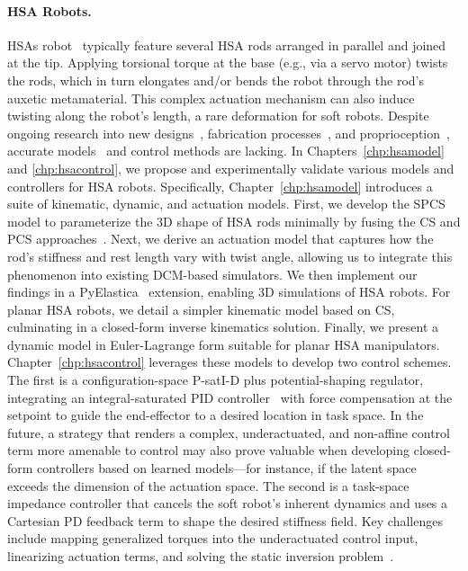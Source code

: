 \paragraph{HSA Robots.}
\glspl{HSA} robot~\citep{lipton2018handedness, chin2018compliant} typically feature several \gls{HSA} rods arranged in parallel and joined at the tip. Applying torsional torque at the base (e.g., via a servo motor) twists the rods, which in turn elongates and/or bends the robot through the rod’s auxetic metamaterial. This complex actuation mechanism can also induce twisting along the robot’s length, a rare deformation for soft robots. Despite ongoing research into new designs~\citep{good2022expanding, good2025torque}, fabrication processes~\citep{truby2021recipe}, and proprioception~\citep{zhang2022vision}, accurate models~\citep{garg2022kinematic} and control methods are lacking. In Chapters~\ref{chp:hsamodel} and \ref{chp:hsacontrol}, we propose and experimentally validate various models and controllers for \gls{HSA} robots.
%
Specifically, Chapter~\ref{chp:hsamodel} introduces a suite of kinematic, dynamic, and actuation models. First, we develop the \gls{SPCS} model to parameterize the 3D shape of \gls{HSA} rods minimally by fusing the \gls{CS} and \gls{PCS} approaches~\citep{renda2018discrete}. Next, we derive an actuation model that captures how the rod’s stiffness and rest length vary with twist angle, allowing us to integrate this phenomenon into existing \gls{DCM}-based simulators. We then implement our findings in a PyElastica~\citep{naughton2021elastica} extension, enabling 3D simulations of \gls{HSA} robots. For planar \gls{HSA} robots, we detail a simpler kinematic model based on \gls{CS}, culminating in a closed-form inverse kinematics solution. Finally, we present a dynamic model in Euler-Lagrange form suitable for planar \gls{HSA} manipulators.
%
Chapter~\ref{chp:hsacontrol} leverages these models to develop two control schemes. The first is a configuration-space P-satI-D plus potential-shaping regulator, integrating an integral-saturated PID controller~\citep{pustina2022p} with force compensation at the setpoint to guide the end-effector to a desired location in task space. 
In the future, a strategy that renders a complex, underactuated, and non-affine control term more amenable to control may also prove valuable when developing closed-form controllers based on learned models—for instance, if the latent space exceeds the dimension of the actuation space.
The second is a task-space impedance controller that cancels the soft robot’s inherent dynamics and uses a Cartesian PD feedback term to shape the desired stiffness field. Key challenges include mapping generalized torques into the underactuated control input, linearizing actuation terms, and solving the static inversion problem~\citep{della2025pushing}.

